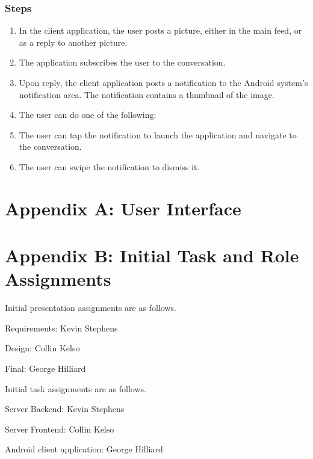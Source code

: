 \documentclass[11pt]{scrartcl}
\let\stdsection\section
\renewcommand\section{\newpage\stdsection}
\begin{document}
        \subsubsection{Steps}
            \begin{enumerate}
                \item In the client application, the user posts a picture, either in the main feed, or as a reply to another picture.
                \item The application subscribes the user to the conversation.
                \item Upon reply, the client application posts a notification to the Android system's notification area.  The notification contains a thumbnail of the image.
                \item The user can do one of the following:
                \item The user can tap the notification to launch the application and navigate to the conversation.
                \item The user can swipe the notification to dismiss it.
            \end{enumerate}

\section*{Appendix A: User Interface}

\section*{Appendix B: Initial Task and Role Assignments}
    Initial presentation assignments are as follows.
    \begin{description*}
        \item[Requirements:] Kevin Stephens
        \item[Design:] Collin Kelso
        \item[Final:] George Hilliard
    \end{description*}

    Initial task assignments are as follows.
    \begin{description*}
        \item[Server Backend:] Kevin Stephens
        \item[Server Frontend:] Collin Kelso
        \item[Android client application:] George Hilliard
    \end{description*}
\end{document}
